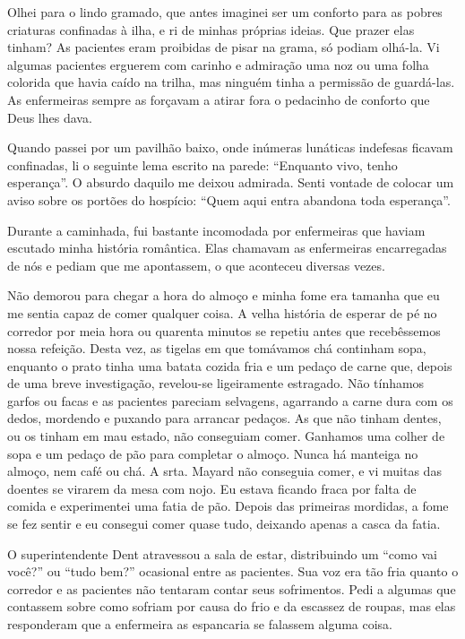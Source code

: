 Olhei para o lindo gramado, que antes imaginei ser um conforto para as
pobres criaturas confinadas à ilha, e ri de minhas próprias ideias. Que
prazer elas tinham? As pacientes eram proibidas de pisar na grama, só
podiam olhá-la. Vi algumas pacientes erguerem com carinho e admiração
uma noz ou uma folha colorida que havia caído na trilha, mas ninguém
tinha a permissão de guardá-las. As enfermeiras sempre as forçavam a
atirar fora o pedacinho de conforto que Deus lhes dava.


Quando passei por um pavilhão baixo, onde inúmeras lunáticas indefesas ficavam
confinadas, li o seguinte lema escrito na parede: ``Enquanto vivo, tenho
esperança''. O absurdo daquilo me deixou admirada. Senti vontade de
colocar um aviso sobre os portões do hospício: ``Quem aqui entra
abandona toda esperança''.

Durante a caminhada, fui bastante incomodada por enfermeiras que haviam
escutado minha história romântica. Elas chamavam as enfermeiras
encarregadas de nós e pediam que me apontassem, o que aconteceu diversas
vezes.

Não demorou para chegar a hora do almoço e minha fome era tamanha que eu
me sentia capaz de comer qualquer coisa. A velha história de esperar de
pé no corredor por meia hora ou quarenta minutos se repetiu antes que
recebêssemos nossa refeição. Desta vez, as tigelas em que tomávamos chá
continham sopa, enquanto o prato tinha uma batata cozida fria e um
pedaço de carne que, depois de uma breve investigação, revelou-se
ligeiramente estragado. Não tínhamos garfos ou facas e as pacientes
pareciam selvagens, agarrando a carne dura com os dedos, mordendo e
puxando para arrancar pedaços. As que não tinham dentes, ou os tinham em
mau estado, não conseguiam comer. Ganhamos uma colher de sopa e um
pedaço de pão para completar o almoço. Nunca há manteiga no almoço, nem
café ou chá. A srta. Mayard não conseguia comer, e vi muitas das doentes
se virarem da mesa com nojo. Eu estava ficando fraca por falta de comida
e experimentei uma fatia de pão. Depois das primeiras mordidas, a fome
se fez sentir e eu consegui comer quase tudo, deixando apenas a casca da
fatia.

O superintendente Dent atravessou a sala de estar, distribuindo um
``como vai você?'' ou ``tudo bem?'' ocasional entre as pacientes. Sua
voz era tão fria quanto o corredor e as pacientes não tentaram contar
seus sofrimentos. Pedi a algumas que contassem sobre como sofriam por
causa do frio e da escassez de roupas, mas elas responderam que a
enfermeira as espancaria se falassem alguma coisa.

